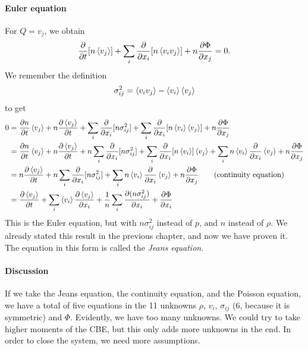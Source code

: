 \paragraph*{Euler equation}
For $Q = v_j$, we obtain
\begin{align}
	\label{eq:euler-collisionless}
	\pdv{}{t}[n \left\langle v_j \right\rangle]
	+ \sum_{i} \pdv{}{x_i} [n \left\langle v_i v_j \right\rangle]
	+ n \pdv{\Phi}{x_j}
	= 0.
\end{align}
We remember the definition
\begin{align*}
	\sigma_{ij}^2 = \left\langle v_i v_j \right\rangle - \left\langle v_i \right\rangle \left\langle v_j \right\rangle
\end{align*}
to get
\begin{align*}
	0
	&= \pdv{n}{t} \left\langle v_j \right\rangle
	+ n \pdv{\left\langle v_j \right\rangle}{t}
	+ \sum_{i} \pdv{}{x_i} [n \sigma_{ij}^2]
	+ \sum_{i} \pdv{}{x_i} [n \left\langle v_i \right\rangle\left\langle v_j \right\rangle]
	+ n \pdv{\Phi}{x_j}\\
	&= \pdv{n}{t} \left\langle v_j \right\rangle
	+ n \pdv{\left\langle v_j \right\rangle}{t}
	+ n \sum_{i} \pdv{}{x_i} [n \sigma_{ij}^2]
	+ \sum_{i} \pdv{}{x_i}[n \left\langle v_i \right\rangle] \left\langle v_j \right\rangle
	+ \sum_{i} n \left\langle v_i \right\rangle \pdv{}{x_i} \left\langle v_j \right\rangle
	+ n \pdv{\Phi}{x_j}\\
	&= n \pdv{\left\langle v_j \right\rangle}{t}
	+ n \sum_{i} \pdv{}{x_i} [n \sigma_{ij}^2]
	+ \sum_{i} n \left\langle v_i \right\rangle \pdv{}{x_i} \left\langle v_j \right\rangle
	+ n \pdv{\Phi}{x_j}
	\qquad \text{(continuity equation)}
	\\
	&= \pdv{\left\langle v_j \right\rangle}{t}
	+ \sum_{i} \left\langle v_i \right\rangle \pdv{\left\langle v_j \right\rangle}{x_i}
	+ \frac{1}{n} \sum_{i} \pdv{(n \sigma_{ij}^2)}{x_i}
	+ \pdv{\Phi}{x_i}
\end{align*}
This is the Euler equation, but with $n \sigma_{ij}^2$ instead of $p$, and $n$ instead of $\rho$. We already stated this result in the previous chapter, and now we have proven it. The equation in this form is called the \emph{Jeans equation}.

\paragraph*{Discussion}
If we take the Jeans equation, the continuity equation, and the Poisson equation, we have a total of five equations in the 11 unknowns $\rho$, $v_i$, $\sigma_{ij}$ (6, because it is symmetric) and $\Phi$. Evidently, we have too many unknowns. We could try to take higher moments of the CBE, but this only adds more unknowns in the end. In order to close the system, we need more assumptions.




